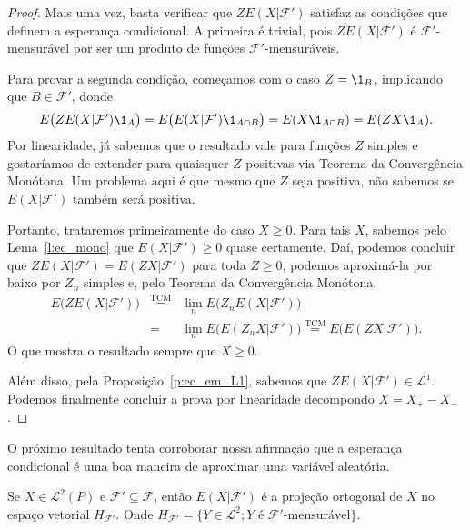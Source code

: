 \begin{proof}
  Mais uma vez, basta verificar que $Z E(X|\mathcal{F}')$ satisfaz as condições que definem a esperança condicional.
  A primeira é trivial, pois $Z E(X|\mathcal{F}')$ é $\mathcal{F}'$-mensurável por ser um produto de funções $\mathcal{F}'$-mensuráveis.

  Para provar a segunda condição, começamos com o caso $Z = \1_B$, implicando que $B \in \mathcal{F}'$, donde
  \begin{equation*}
    E\big(ZE(X|\mathcal{F}') \1_A \big) = E\big( E(X|\mathcal{F}') \1_{A \cap B}\big) = E(X \1_{A \cap B}) = E(ZX \1_A).
  \end{equation*}
  Por linearidade, já sabemos que o resultado vale para funções $Z$ simples e gostaríamos de extender para quaisquer $Z$ positivas via Teorema da Convergência Monótona.
  Um problema aqui é que mesmo que $Z$ seja positiva, não sabemos se $E(X|\mathcal{F}')$ também será positiva.

  Portanto, trataremos primeiramente do caso $X \geq 0$.
  Para tais $X$, sabemos pelo Lema~\ref{l:ec_mono} que $E(X|\mathcal{F}') \geq 0$ quase certamente.
  Daí, podemos concluir que $Z E(X|\mathcal{F}') = E(ZX|\mathcal{F}')$ para toda $Z \geq 0$, podemos aproximá-la por baixo por $Z_n$ simples e, pelo Teorema da Convergência Monótona,
  \begin{equation}
    \begin{array}{e}
      E\big( Z E(X|\mathcal{F}') \big) & \overset{\text{TCM}}= & \lim_n E\big( Z_n E(X|\mathcal{F}') \big)\\
      & = & \lim_n E\big( E(Z_n X|\mathcal{F}') \big) \overset{\text{TCM}}= E\big( E(ZX|\mathcal{F}') \big).
    \end{array}
  \end{equation}
  O que mostra o resultado sempre que $X \geq 0$.

  Além disso, pela Proposição~\ref{p:ec_em_L1}, sabemos que $Z E(X|\mathcal{F}') \in \mathcal{L}^1$.
  Podemos finalmente concluir a prova por linearidade decompondo $X = X_+ - X_-$.
\end{proof}

O próximo resultado tenta corroborar nossa afirmação que a esperança condicional é uma boa maneira de aproximar uma variável aleatória.

\begin{lemma}
  Se $X \in \mathcal{L}^2(P)$ e $\mathcal{F}' \subseteq \mathcal{F}$, então $E(X|\mathcal{F}')$ é a projeção ortogonal de $X$ no espaço vetorial $H_{\mathcal{F}'}$.
  Onde $H_{\mathcal{F}'} = \{Y \in \mathcal{L}^2; Y \text{ é $\mathcal{F}'$-mensurável}\}$.
\end{lemma}


